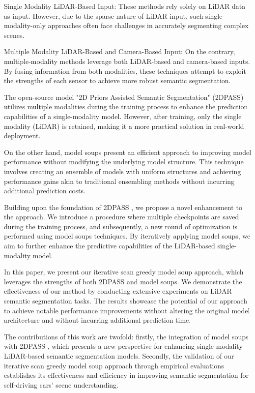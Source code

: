 \documentclass[10pt,twocolumn,letterpaper]{article}
\begin{document}
Single Modality LiDAR-Based Input: These methods rely solely on LiDAR data as input. However, due to the sparse nature of LiDAR input, such single-modality-only approaches often face challenges in accurately segmenting complex scenes.

Multiple Modality LiDAR-Based and Camera-Based Input: On the contrary, multiple-modality methods leverage both LiDAR-based and camera-based inputs. By fusing information from both modalities, these techniques attempt to exploit the strengths of each sensor to achieve more robust semantic segmentation.

The open-source model "2D Priors Assisted Semantic Segmentation" (2DPASS)\cite{yan20222dpass} utilizes multiple modalities during the training process to enhance the prediction capabilities of a single-modality model. However, after training, only the single modality (LiDAR) is retained, making it a more practical solution in real-world deployment.

On the other hand, model soups present an efficient approach to improving model performance without modifying the underlying model structure. This technique involves creating an ensemble of models with uniform structures and achieving performance gains akin to traditional ensembling methods without incurring additional prediction costs.

Building upon the foundation of 2DPASS \cite{yan20222dpass}, we propose a novel enhancement to the approach. We introduce a procedure where multiple checkpoints are saved during the training process, and subsequently, a new round of optimization is performed using model soups techniques. By iteratively applying model soups, we aim to further enhance the predictive capabilities of the LiDAR-based single-modality model.

In this paper, we present our iterative scan greedy model soup approach, which leverages the strengths of both 2DPASS \cite{yan20222dpass} and model soups. We demonstrate the effectiveness of our method by conducting extensive experiments on LiDAR semantic segmentation tasks. The results showcase the potential of our approach to achieve notable performance improvements without altering the original model architecture and without incurring additional prediction time.

The contributions of this work are twofold: firstly, the integration of model soups with 2DPASS \cite{yan20222dpass}, which presents a new perspective for enhancing single-modality LiDAR-based semantic segmentation models. Secondly, the validation of our iterative scan greedy model soup approach through empirical evaluations establishes its effectiveness and efficiency in improving semantic segmentation for self-driving cars' scene understanding.
\end{document}

